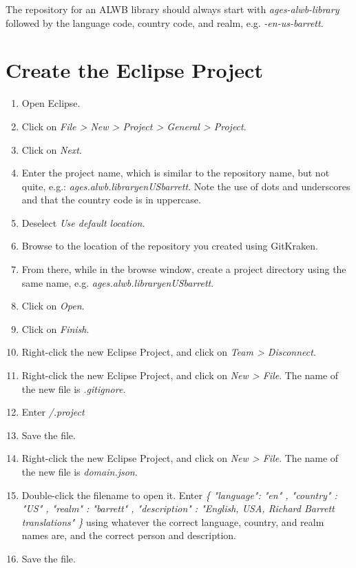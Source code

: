 \documentclass[]{memoir}
\begin{document}
\begin{warning}
The repository for an ALWB library should always start with \emph{ages-alwb-library} followed by the language code, country code, and realm, e.g. \emph{-en-us-barrett}.
\end{warning}

\section{Create the Eclipse Project}

\begin{enumerate}
    \item Open Eclipse.
    \item Click on \emph{File > New > Project > General > Project}.
    \item Click on \emph{Next}.
    \item Enter the project name, which is similar to the repository name, but not quite, e.g.: \emph{ages.alwb.library\textunderscore en\textunderscore US\textunderscore barrett}.  Note the use of dots and underscores and that the country code is in uppercase.
    \item Deselect \emph{Use default location}.
    \item Browse to the location of the repository you created using GitKraken.
    \item From there, while in the browse window, create a project directory using the same name, e.g. \emph{ages.alwb.library\textunderscore en\textunderscore US\textunderscore barrett}.
    \item Click on \emph{Open}.
    \item Click on \emph{Finish}.
    \item Right-click the new Eclipse Project, and click on \emph{Team > Disconnect}.
    \item Right-click the new Eclipse Project, and click on \emph{New > File}.  The name of the new file is \emph{.gitignore}.  
    \item Enter \emph{/.project}
    \item Save the file.
    \item Right-click the new Eclipse Project, and click on \emph{New > File}.  The name of the new file is \emph{domain.json}.  
    \item Double-click the filename to open it.  Enter \emph{\{
  "language": "en"
  , "country" : "US"
  , "realm" : "barrett"
  , "description" : "English, USA, Richard Barrett translations"
\}} using whatever the correct language, country, and realm names are, and the correct person and description.
    \item Save the file.
\end{enumerate}
\end{document}
